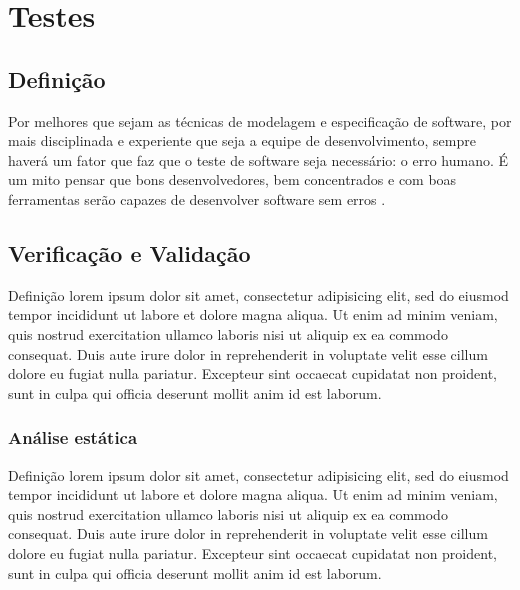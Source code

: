 \documentclass[
	12pt,				%
	openright,			%
	twoside,			%
	a4paper,			%
	english,			%
	brazil,				%
	]{abntex2}
\begin{document}
\chapter{Testes}

\section{Definição}

\begin{citacao}
Por melhores que sejam as técnicas de modelagem e especificação de software, por mais disciplinada e experiente que seja a equipe de desenvolvimento, sempre haverá um fator que faz que o teste de software seja necessário: o erro humano. É um mito pensar que bons desenvolvedores, bem concentrados e com boas ferramentas serão capazes de desenvolver software sem erros . %
\end{citacao}


\section{Verificação e Validação}

Definição lorem ipsum dolor sit amet, consectetur adipisicing elit, sed do eiusmod
tempor incididunt ut labore et dolore magna aliqua. Ut enim ad minim veniam,
quis nostrud exercitation ullamco laboris nisi ut aliquip ex ea commodo
consequat. Duis aute irure dolor in reprehenderit in voluptate velit esse
cillum dolore eu fugiat nulla pariatur. Excepteur sint occaecat cupidatat non
proident, sunt in culpa qui officia deserunt mollit anim id est laborum.


\subsection{Análise estática}

Definição lorem ipsum dolor sit amet, consectetur adipisicing elit, sed do eiusmod
tempor incididunt ut labore et dolore magna aliqua. Ut enim ad minim veniam,
quis nostrud exercitation ullamco laboris nisi ut aliquip ex ea commodo
consequat. Duis aute irure dolor in reprehenderit in voluptate velit esse
cillum dolore eu fugiat nulla pariatur. Excepteur sint occaecat cupidatat non
proident, sunt in culpa qui officia deserunt mollit anim id est laborum.
\end{document}
